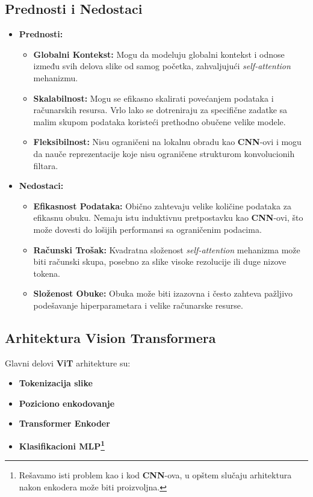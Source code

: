 \documentclass[12pt]{article}
\begin{document}
   \subsection{Prednosti i Nedostaci}
   \begin{itemize}
      \item \textbf{Prednosti:}
      \begin{itemize}
          \item \textbf{Globalni Kontekst:} Mogu da modeluju globalni kontekst 
          i odnose između svih delova slike od samog početka, zahvaljujući \textit{self-attention} 
          mehanizmu.
          \item \textbf{Skalabilnost:} Mogu se efikasno skalirati povećanjem podataka i računarskih 
          resursa. Vrlo lako se dotreniraju za specifične zadatke sa malim skupom podataka 
          koristeći prethodno obučene velike modele.
          \item \textbf{Fleksibilnost:} Nisu ograničeni na lokalnu obradu kao \textbf{CNN}-ovi i 
          mogu da nauče reprezentacije koje nisu ograničene strukturom konvolucionih filtara.
      \end{itemize}
      \item \textbf{Nedostaci:}
      \begin{itemize}
         \item \textbf{Efikasnost Podataka:} Obično zahtevaju velike količine 
         podataka za efikasnu obuku. Nemaju istu induktivnu pretpostavku kao \textbf{CNN}-ovi, 
         što može dovesti do lošijih performansi sa ograničenim podacima.
         \item \textbf{Računski Trošak:} Kvadratna složenost \textit{self-attention} mehanizma 
         može biti računski skupa, posebno za slike visoke rezolucije ili duge nizove tokena.
         \item \textbf{Složenost Obuke:} Obuka može biti izazovna i često zahteva pažljivo 
         podešavanje hiperparametara i velike računarske resurse.
      \end{itemize}
  \end{itemize}

  \newpage
  \subsection{Arhitektura Vision Transformera}
  Glavni delovi \textbf{ViT} arhitekture su:
   \begin{itemize}
         \item \textbf{Tokenizacija slike}
         \item \textbf{Poziciono enkodovanje}
         \item \textbf{Transformer Enkoder}
         \item \textbf{Klasifikacioni MLP\footnote{Rešavamo isti problem kao i kod \textbf{CNN}-ova, u opštem slučaju arhitektura nakon enkodera može biti proizvoljna.}}
   \end{itemize}
\end{document}
